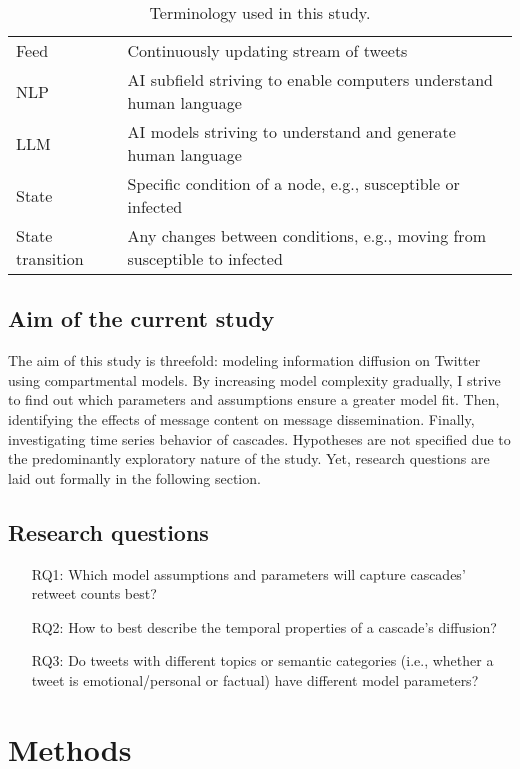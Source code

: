 \documentclass[11pt,a4paper]{article}
\begin{document}
\begin{table}[h]
\begin{tabularx}{\textwidth}{|l|X|}
        Feed & Continuously updating stream of tweets \\
        NLP & AI subfield striving to enable computers understand human language \\
        LLM & AI models striving to understand and generate human language \\
        State & Specific condition of a node, e.g., susceptible or infected \\
        State transition & Any changes between conditions, e.g., moving from susceptible to infected \\
        \hline
    \end{tabularx}
    \caption{Terminology used in this study.}
\end{table}
    
    \subsection{Aim of the current study}
    The aim of this study is threefold: modeling information diffusion on Twitter using compartmental models. By increasing model complexity gradually, I strive to find out which parameters and assumptions ensure a greater model fit. Then, identifying the effects of message content on message dissemination. Finally, investigating time series behavior of cascades. Hypotheses are not specified due to the predominantly exploratory nature of the study. Yet, research questions are laid out formally in the following section.

    \subsection{Research questions}
        \begin{enumerate}
            \item[RQ1:] Which model assumptions and parameters will capture cascades' retweet counts best?
            
            \item[RQ2:] How to best describe the temporal properties of a cascade's diffusion?
            
            \item[RQ3:] Do tweets with different topics or semantic categories (i.e., whether a tweet is emotional/personal or factual) have different model parameters?
        \end{enumerate}

\clearpage
\section{Methods}
\end{document}
